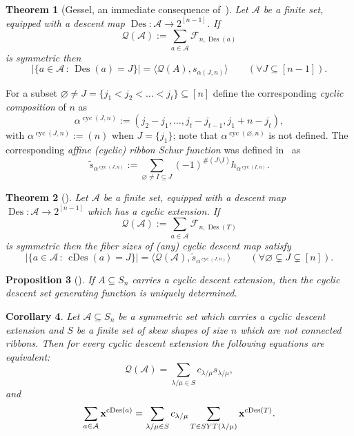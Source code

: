 \documentclass[10pt]{article}
\newtheorem{theorem}{Theorem}[section]
\newtheorem{proposition}[theorem]{Proposition}
\newtheorem{corollary}[theorem]{Corollary}
\theoremstyle{definition}
\newcommand{\Q}{\mathcal Q}
\newcommand{\f}{\mathcal F}
\newcommand{\A}{\mathcal A}
\DeclareMathOperator\Des{Des}
\DeclareMathOperator\cDes{cDes}
\DeclareMathOperator\cyc{cyc}
\newcommand\ccomp[2]{\alpha^{\cyc{(#2,#1)}}}
\newcommand{\cs}{\tilde s}
\def\SYT{{\rm SYT}}
\begin{document}
\begin{theorem} [{Gessel, an immediate consequence of~\cite[Theorem 3]{Gessel}}]\label{thm:fiber-Des}
    Let  $\A$ be a finite set, equipped with a descent map
    $\Des: \A \longrightarrow 2^{[n-1]}$. 
    If 
    \[
        \Q(\A) :=
        \sum_{a\in \A} \f_{n,\Des(a)}
    \]
    is symmetric then
    \[
        |\{a \in \A \,:\, \Des(a)=J\}| = \langle \Q(A), s_{\alpha(J,n)} \rangle
        \qquad (\forall J\subseteq [n-1]).
    \]
\end{theorem}

For a subset $\varnothing \ne J = \{ j_1 < j_2 < \ldots < j_t \}
\subseteq [n]$
define the corresponding {\em cyclic composition} of $n$  as
\[
    \ccomp{n}{J} := 
    (j_2-j_1, \ldots, j_t - j_{t-1}, j_1 + n - j_t),
\]
with $\ccomp{n}{J} := (n)$ when $J = \{j_1\}$;
note that $\ccomp{n}{\varnothing}$ is not defined.
The corresponding {\em affine (cyclic) ribbon Schur function} was defined in~\cite{ARR} as
\[
    \cs_{\ccomp{n}{J}} := 
    \sum_{\varnothing \neq I \subseteq J}
    (-1)^{\#(J \setminus I)} h_{\ccomp{n}{I}}.
\]

\begin{theorem}[{\cite[Cor. 4.13]{AGRR}}]\label{thm:fiber-cDes}
    Let $\A$ be a finite set, equipped with a descent map
    $\Des: \A \longrightarrow 2^{[n-1]}$ 
    which has a cyclic  extension. If
    \[
        \Q(\A):=\sum\limits_{a\in \A} \f_{n,\Des(T)}
    \]
    is symmetric then the fiber sizes of (any) cyclic descent map satisfy
    \[
        |\{a \in \A \,:\, \cDes(a) =J\}|
        = \langle \Q(\A), \cs_{\ccomp{n}{J}} \rangle
        \qquad \left( \forall \varnothing \subsetneq J \subsetneq [n] \right).
    \]
\end{theorem}

\begin{proposition}[{\cite[Lemma 2.2]{ARR}}] If $A\subseteq S_n$ carries a cyclic descent extension, then 
the cyclic descent set generating function is uniquely determined.
\end{proposition}

\begin{corollary}\label{cor:cDes-dist-Schur}
    Let $\A\subseteq S_n$ be a symmetric set which carries a cyclic descent extension 
    and $S$ be a finite set of skew shapes of size $n$ which are not connected ribbons. Then 
    for every cyclic descent extension 
    the following equations are equivalent:
    \begin{equation}\label{eq:dist1}
        \Q(\A) = \sum\limits_{\lambda/\mu\in S} c_{\lambda/\mu} s_{\lambda/\mu},
    \end{equation}
    and
    \begin{equation}\label{eq:dist2}
        \sum\limits_{a\in \A} {\bf x}^{\cDes(a)} = \sum\limits_{\lambda/\mu\in S} c_{\lambda/\mu} 
        \sum\limits_{T\in \SYT(\lambda/\mu)} {\bf x}^{\cDes(T)}.
    \end{equation}
\end{corollary}
\end{document}
